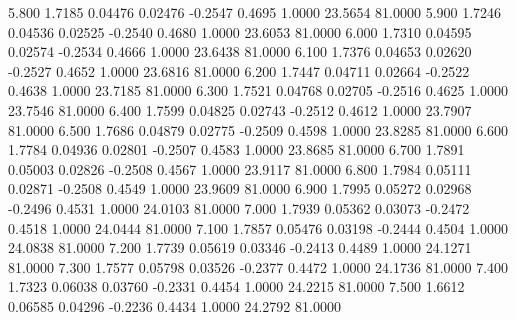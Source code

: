    5.800   1.7185   0.04476   0.02476  -0.2547   0.4695   1.0000  23.5654  81.0000
   5.900   1.7246   0.04536   0.02525  -0.2540   0.4680   1.0000  23.6053  81.0000
   6.000   1.7310   0.04595   0.02574  -0.2534   0.4666   1.0000  23.6438  81.0000
   6.100   1.7376   0.04653   0.02620  -0.2527   0.4652   1.0000  23.6816  81.0000
   6.200   1.7447   0.04711   0.02664  -0.2522   0.4638   1.0000  23.7185  81.0000
   6.300   1.7521   0.04768   0.02705  -0.2516   0.4625   1.0000  23.7546  81.0000
   6.400   1.7599   0.04825   0.02743  -0.2512   0.4612   1.0000  23.7907  81.0000
   6.500   1.7686   0.04879   0.02775  -0.2509   0.4598   1.0000  23.8285  81.0000
   6.600   1.7784   0.04936   0.02801  -0.2507   0.4583   1.0000  23.8685  81.0000
   6.700   1.7891   0.05003   0.02826  -0.2508   0.4567   1.0000  23.9117  81.0000
   6.800   1.7984   0.05111   0.02871  -0.2508   0.4549   1.0000  23.9609  81.0000
   6.900   1.7995   0.05272   0.02968  -0.2496   0.4531   1.0000  24.0103  81.0000
   7.000   1.7939   0.05362   0.03073  -0.2472   0.4518   1.0000  24.0444  81.0000
   7.100   1.7857   0.05476   0.03198  -0.2444   0.4504   1.0000  24.0838  81.0000
   7.200   1.7739   0.05619   0.03346  -0.2413   0.4489   1.0000  24.1271  81.0000
   7.300   1.7577   0.05798   0.03526  -0.2377   0.4472   1.0000  24.1736  81.0000
   7.400   1.7323   0.06038   0.03760  -0.2331   0.4454   1.0000  24.2215  81.0000
   7.500   1.6612   0.06585   0.04296  -0.2236   0.4434   1.0000  24.2792  81.0000
